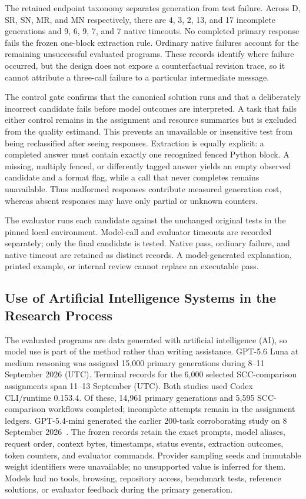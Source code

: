 The retained endpoint taxonomy separates generation from test failure. Across D, SR, SN, MR, and MN respectively, there are 4, 3, 2, 13, and 17 incomplete generations and 9, 6, 9, 7, and 7 native timeouts. No completed primary response fails the frozen one-block extraction rule. Ordinary native failures account for the remaining unsuccessful evaluated programs. These records identify where failure occurred, but the design does not expose a counterfactual revision trace, so it cannot attribute a three-call failure to a particular intermediate message.

The control gate confirms that the canonical solution runs and that a deliberately incorrect candidate fails before model outcomes are interpreted. A task that fails either control remains in the assignment and resource summaries but is excluded from the quality estimand. This prevents an unavailable or insensitive test from being reclassified after seeing responses. Extraction is equally explicit: a completed answer must contain exactly one recognized fenced Python block. A missing, multiply fenced, or differently tagged answer yields an empty observed candidate and a format flag, while a call that never completes remains unavailable. Thus malformed responses contribute measured generation cost, whereas absent responses may have only partial or unknown counters.

The evaluator runs each candidate against the unchanged original tests in the pinned local environment. Model-call and evaluator timeouts are recorded separately; only the final candidate is tested. Native pass, ordinary failure, and native timeout are retained as distinct records. A model-generated explanation, printed example, or internal review cannot replace an executable pass.

\subsection{Use of Artificial Intelligence Systems in the Research Process}
The evaluated programs are data generated with artificial intelligence (AI), so model use is part of the method rather than writing assistance. GPT-5.6 Luna at medium reasoning was assigned 15,000 primary generations during 8--11 September 2026 (UTC). Terminal records for the 6,000 selected SCC-comparison assignments span 11--13 September (UTC). Both studies used Codex CLI/runtime 0.153.4. Of these, 14,961 primary generations and 5,595 SCC-comparison workflows completed; incomplete attempts remain in the assignment ledgers. GPT-5.4-mini generated the earlier 200-task corroborating study on 8 September 2026~\cite{openai54mini2026}. The frozen records retain the exact prompts, model aliases, request order, context bytes, timestamps, status events, extraction outcomes, token counters, and evaluator commands. Provider sampling seeds and immutable weight identifiers were unavailable; no unsupported value is inferred for them. Models had no tools, browsing, repository access, benchmark tests, reference solutions, or evaluator feedback during the primary generation.


